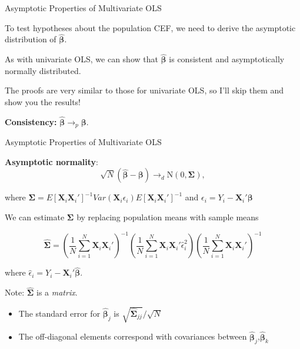\documentclass[11pt,english,handout]{beamer}
\newenvironment{wideitemize}{\itemize\addtolength{\itemsep}{10pt}}{\enditemize}
\begin{document}
	\begin{frame}{Asymptotic Properties of Multivariate OLS} 
		\begin{wideitemize}
			
		\item
		To test hypotheses about the population CEF, we need to derive the asymptotic distribution of $\bm{\hat\beta}$. 
		
		\pause
			
		\item
		As with univariate OLS, we can show that $\bm{\hat\beta}$ is consistent and asymptotically normally distributed.
		\pause
	
		\item
		The proofs are very similar to those for univariate OLS, so I'll skip them and show you the results!
		
		\pause
		\item
		\textbf{Consistency:} $\bm{\hat\beta} \rightarrow_p \bm{\beta}$.
		
		\end{wideitemize}
	\end{frame}

	\begin{frame}{Asymptotic Properties of Multivariate OLS} 
		\begin{wideitemize}
			\item
			\textbf{Asymptotic normality}:
			$$\sqrt{N} (\bm{\hat\beta} - \bm{\beta}) \rightarrow_d \mathrm{N}(0, \bm{\Sigma}),$$
			
			\noindent where $\bm{\Sigma} = E[ \bm{X}_i \bm{X}_i' ]^{-1} Var( \bm{X}_i \epsilon_i  )	E[ \bm{X}_i \bm{X}_i' ]^{-1} $ and $\epsilon_i = Y_i - \bm{X}_i' \bm{\beta}$
			
			
			\pause
			\item 
			We can estimate $\bm{\Sigma}$ by replacing population means with sample means	
			
			$$\bm{\hat\Sigma} = \left( \frac{1}{N} \sum_{i=1}^N \bm{X}_i \bm{X}_i' \right)^{-1} \left(\frac{1}{N} \sum_{i=1}^N \bm{X}_i \bm{X}_i' \hat\epsilon_i^2  \right) \left( \frac{1}{N} \sum_{i=1}^N \bm{X}_i \bm{X}_i' \right)^{-1}  $$
			
			where  $\hat\epsilon_i = Y_i - \bm{X}_i' \bm{\hat\beta}$.
			
			
			\item\pause{}
			Note: $\bm{\hat\Sigma}$ is a \textit{matrix}. 
				\begin{itemize}
					\item 
					The standard error for $\bm{\hat\beta}_j$ is $\sqrt{\bm{\hat\Sigma}_{jj}} / \sqrt{N}$
					
					\item
					The off-diagonal elements correspond with covariances between $\bm{\hat\beta}_j$,$\bm{\hat\beta}_k$
				\end{itemize}
			
		\end{wideitemize}
	\end{frame}
\end{document}
